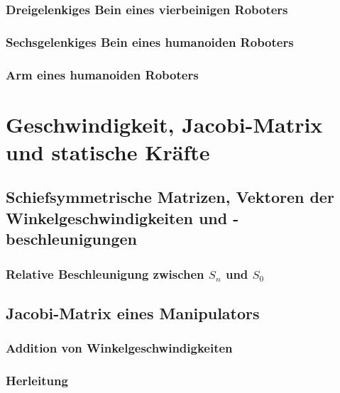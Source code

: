 \documentclass[a4paper, 11pt, accentcolor = tud3b]{tudreport}
\begin{document}
			\subsection{Dreigelenkiges Bein eines vierbeinigen Roboters} %

			\subsection{Sechsgelenkiges Bein eines humanoiden Roboters} %

			\subsection{Arm eines humanoiden Roboters} %

	\chapter{Geschwindigkeit, Jacobi-Matrix und statische Kräfte} %

		\section{Schiefsymmetrische Matrizen, Vektoren der Winkelgeschwindigkeiten und -beschleunigungen} %

			\subsection{Relative Beschleunigung zwischen \(S_n\) und \(S_0\)} %

		\section{Jacobi-Matrix eines Manipulators} %

			\subsection{Addition von Winkelgeschwindigkeiten} %

			\subsection{Herleitung} %
\end{document}
